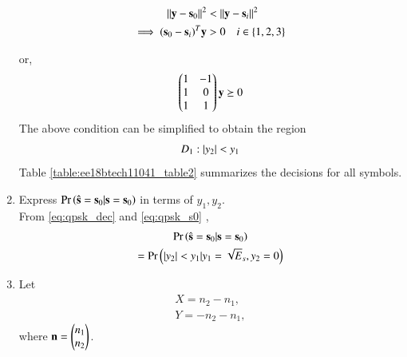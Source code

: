\documentclass[journal,12pt,twocolumn]{IEEEtran}
\renewcommand\thesection{\arabic{section}}
\begin{document}
\begin{enumerate}[label=\arabic*.,ref=\thesection.\theenumi]
\begin{align}
    \left\lVert\mathbf{y}-\mathbf{s}_0\right\rVert^2 &< \left\lVert\mathbf{y}-\mathbf{s}_i\right\rVert^2
\\
\implies    (\mathbf{s}_0-\mathbf{s}_i)^T\mathbf{y}&>0 \quad i \in \left\{1,2,3\right\}
\end{align}
%


%
or,
\begin{align}
\begin{pmatrix}1 & -1 \\ 1& 0 \\ 1 & 1\end{pmatrix}\mathbf{y}\succeq 0
\end{align}
The above condition can be simplified to obtain the region
\begin{align}
D_1: \left\vert y_2\right\vert< y_1
\label{eq:qpsk_s0}
\end{align}
Table \ref{table:ee18btech11041_table2} summarizes the decisions for all symbols.
%
%
\begin{table}[!ht]
\centering

\caption{}
\label{table:ee18btech11041_table2}
\end{table}


\item Express $\Pr\left(\hat{\mathbf{s}} = \mathbf{s}_0|\mathbf{s} = \mathbf{s}_0\right)$ in terms of 
$y_1, y_2$.
\\
\solution From \eqref{eq:qpsk_dec} and \eqref{eq:qpsk_s0}
,
\begin{multline}
\label{eq:ser_dec}
\Pr\left(\hat{\mathbf{s}} = \mathbf{s}_0|\mathbf{s} = \mathbf{s}_0\right) 
\\
= \Pr\left(\left\vert y_2\right\vert < y_1
|y_1 = \sqrt{E}_s, y_2 = 0\right)
\end{multline}
\item Let 
\label{prob:qpsk_xy}
\begin{align}
\label{eq:qpskx}
X=n_2-n_1, 
\\
Y = -n_2-n_1, 
\label{eq:qpsky}
\end{align}
where $\mathbf{n}=\begin{pmatrix}n_1\\n_2\end{pmatrix}$.


\end{enumerate}
\end{document}
